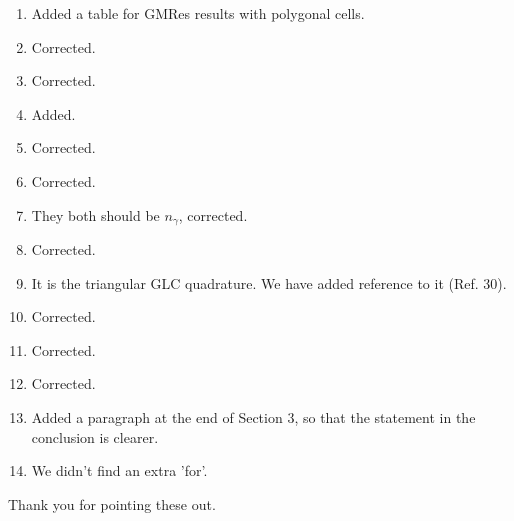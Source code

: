 \documentclass{article}
\begin{document}
\begin{enumerate}
\item Added a table for GMRes results with polygonal cells.
\item Corrected.
\item Corrected.
\item Added.
\item Corrected.
\item Corrected.
\item They both should be $n_\gamma$, corrected.
\item Corrected.
\item It is the triangular GLC quadrature. We have added reference to it (Ref. 30).
\item Corrected.
\item Corrected.
\item Corrected.
\item Added a paragraph at the end of Section 3, so that the statement in the conclusion is clearer.
\item We didn't find an extra 'for'.
\end{enumerate}

\noindent 
Thank you for pointing these out.
\end{document}

